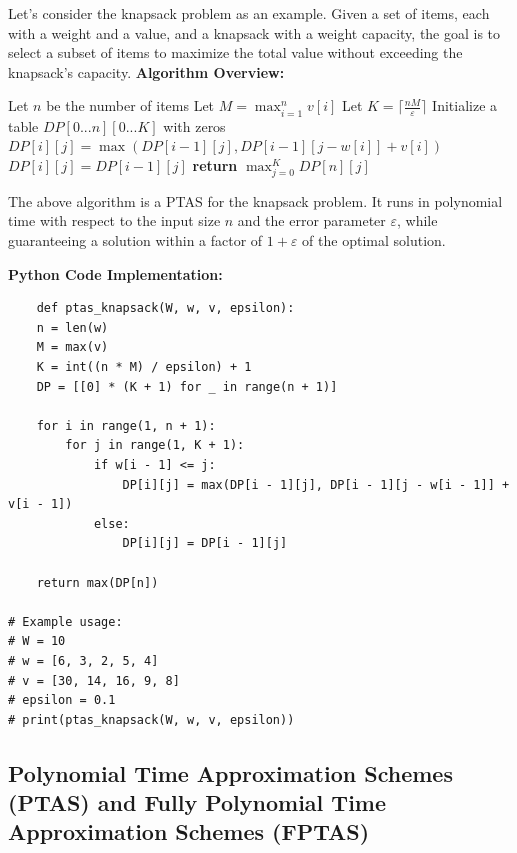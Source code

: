 \documentclass[12pt]{book} %
\begin{document}
Let's consider the knapsack problem as an example. Given a set of items, each with a weight and a value, and a knapsack with a weight capacity, the goal is to select a subset of items to maximize the total value without exceeding the knapsack's capacity.
\FloatBarrier
\textbf{Algorithm Overview:}
\FloatBarrier
\begin{algorithm}
\caption{Polynomial Time Approximation Scheme for Knapsack Problem}
\begin{algorithmic}[1]
    \State Let $n$ be the number of items
    \State Let $M = \max_{i=1}^{n} v[i]$
    \State Let $K = \lceil \frac{nM}{\varepsilon} \rceil$
    \State Initialize a table $DP[0...n][0...K]$ with zeros
                \State $DP[i][j] = \max(DP[i-1][j], DP[i-1][j-w[i]] + v[i])$
            \Else
                \State $DP[i][j] = DP[i-1][j]$
            \EndIf
        \EndFor
    \EndFor
    \State \textbf{return} $\max_{j=0}^{K} DP[n][j]$
\EndFunction
\end{algorithmic}
\end{algorithm}
\FloatBarrier
The above algorithm is a PTAS for the knapsack problem. It runs in polynomial time with respect to the input size \(n\) and the error parameter \(\varepsilon\), while guaranteeing a solution within a factor of \(1 + \varepsilon\) of the optimal solution.

\textbf{Python Code Implementation:}
\FloatBarrier
\begin{lstlisting}
    def ptas_knapsack(W, w, v, epsilon):
    n = len(w)
    M = max(v)
    K = int((n * M) / epsilon) + 1
    DP = [[0] * (K + 1) for _ in range(n + 1)]

    for i in range(1, n + 1):
        for j in range(1, K + 1):
            if w[i - 1] <= j:
                DP[i][j] = max(DP[i - 1][j], DP[i - 1][j - w[i - 1]] + v[i - 1])
            else:
                DP[i][j] = DP[i - 1][j]

    return max(DP[n])

# Example usage:
# W = 10
# w = [6, 3, 2, 5, 4]
# v = [30, 14, 16, 9, 8]
# epsilon = 0.1
# print(ptas_knapsack(W, w, v, epsilon))
\end{lstlisting}

\subsection{Polynomial Time Approximation Schemes (PTAS) and Fully Polynomial Time Approximation Schemes (FPTAS)}
\end{document}
